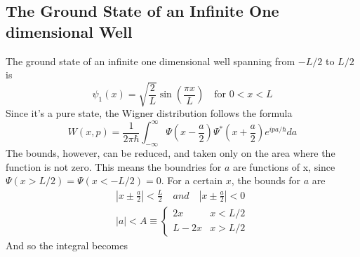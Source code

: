 \documentclass{article}
\begin{document}
\subsection{The Ground State of an Infinite One dimensional Well}
The ground state of an infinite one dimensional well spanning from $-L/2$ to $L/2$ is
\begin{equation}
    \psi_1(x) = \sqrt{\frac{2}{L}} \sin\left(\frac{\pi x}{L}\right) \quad \text{for } 0 < x < L
\end{equation}
Since it's a pure state, the Wigner distribution follows the formula
\begin{equation}
    W(x, p) = \frac{1}{2\pi\hbar} \int_{-\infty}^{\infty} \Psi\left(x - \frac{a}{2}\right) \Psi^* \left(x + \frac{a}{2}\right) e^{ipa/\hbar}da
\end{equation}
The bounds, however, can be reduced, and taken only on the area where the function is not zero. This means the boundries for $a$ are functions of x, since $\Psi(x > L/2) = \Psi(x < -L/2) = 0$. For a certain $x$, the bounds for $a$ are
\begin{equation}
\begin{gathered}
    \left|x \pm \frac{a}{2}\right| < \frac{L}{2} \quad and \quad \left|x \pm \frac{a}{2}\right| < 0 \\
    |a| < A \equiv \begin{cases}
        2x & x < L/2 \\
        L - 2x & x > L/2
    \end{cases}
\end{gathered}
\end{equation}
And so the integral becomes
\end{document}

